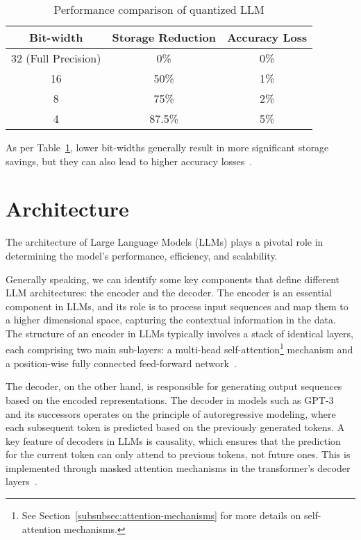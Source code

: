 \begin{table}[htbp]
	\centering
	\begin{tabular}{ccc}
		\toprule
		Bit-width           & Storage Reduction & Accuracy Loss \\
		\midrule
		32 (Full Precision) & 0\%               & 0\%           \\
		16                  & 50\%              & 1\%           \\
		8                   & 75\%              & 2\%           \\
		4                   & 87.5\%            & 5\%           \\
		\bottomrule
	\end{tabular}
	\caption{Performance comparison of quantized LLM}
	\label{tab:quant_perf}
\end{table}

As per Table~\ref{tab:quant_perf}, lower bit-widths generally result in more significant storage savings, but they can also lead to higher accuracy losses~\cite{jacob2017quantization}.

\section{Architecture}
\label{sec:architecture}

The architecture of Large Language Models (LLMs) plays a pivotal role in determining the model's performance, efficiency, and scalability.

Generally speaking, we can identify some key components that define different LLM architectures: the encoder and the decoder.
The encoder is an essential component in LLMs, and its role is to process input sequences and map them to a higher dimensional space, capturing the contextual information in the data.
The structure of an encoder in LLMs typically involves a stack of identical layers, each comprising two main sub-layers: a multi-head self-attention\footnote{See Section~\ref{subsubsec:attention-mechanisms} for more details on self-attention mechanisms.} mechanism and a position-wise fully connected feed-forward network~\cite{vaswani2023attention}.

The decoder, on the other hand, is responsible for generating output sequences based on the encoded representations.
The decoder in models such as GPT-3~\cite{brown2020language} and its successors operates on the principle of autoregressive modeling, where each subsequent token is predicted based on the previously generated tokens.
A key feature of decoders in LLMs is causality, which ensures that the prediction for the current token can only attend to previous tokens, not future ones.
This is implemented through masked attention mechanisms in the transformer's decoder layers~\cite{vaswani2023attention}.

